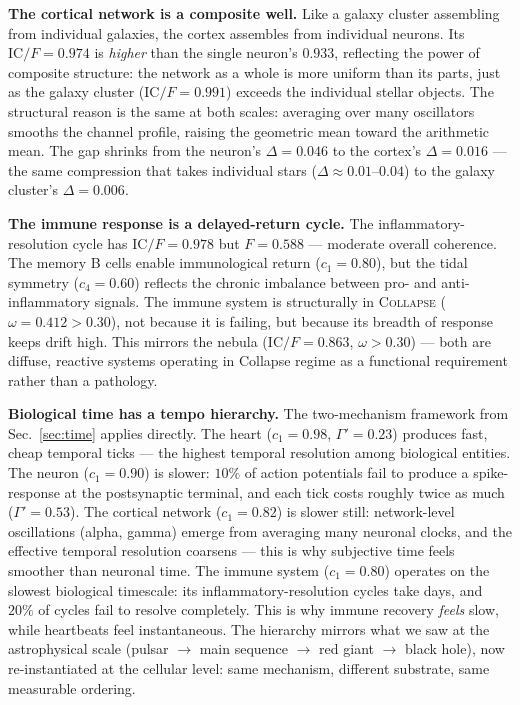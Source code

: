 \documentclass[
  aps,
  prd,
  twocolumn,
  superscriptaddress,
  nofootinbib,
  floatfix
]{revtex4-2}
\newcommand{\Gam}{\Gamma}
\newcommand{\regime}[1]{\textsc{#1}}
\newcommand{\IC}{\mathrm{IC}}
\begin{document}
\textbf{The cortical network is a composite well.}
Like a galaxy cluster assembling from individual galaxies,
the cortex assembles from individual neurons.  Its
$\IC/F = 0.974$ is \emph{higher} than the single neuron's
$0.933$, reflecting the power of composite structure: the
network as a whole is more uniform than its parts, just as
the galaxy cluster ($\IC/F = 0.991$) exceeds the individual
stellar objects.  The structural reason is the same at both
scales: averaging over many oscillators smooths the channel
profile, raising the geometric mean toward the arithmetic
mean.  The gap shrinks from the neuron's $\Delta = 0.046$ to
the cortex's $\Delta = 0.016$ --- the same compression that
takes individual stars ($\Delta \approx 0.01$--$0.04$) to
the galaxy cluster's $\Delta = 0.006$.

\textbf{The immune response is a delayed-return cycle.}
The inflammatory-resolution cycle has $\IC/F = 0.978$ but
$F = 0.588$ --- moderate overall coherence.  The memory B
cells enable immunological return ($c_1 = 0.80$), but the
tidal symmetry ($c_4 = 0.60$) reflects the chronic
imbalance between pro- and anti-inflammatory signals.
The immune system is structurally in \regime{Collapse}
($\omega = 0.412 > 0.30$), not because it is failing, but
because its breadth of response keeps drift high.  This
mirrors the nebula ($\IC/F = 0.863$, $\omega > 0.30$) ---
both are diffuse, reactive systems operating in Collapse
regime as a functional requirement rather than a pathology.

\textbf{Biological time has a tempo hierarchy.}
The two-mechanism framework from Sec.~\ref{sec:time} applies
directly.  The heart ($c_1 = 0.98$, $\Gam' = 0.23$)
produces fast, cheap temporal ticks --- the highest
temporal resolution among biological entities.  The neuron ($c_1 =
0.90$) is slower: $10\%$ of action potentials fail
to produce a spike-response at the postsynaptic terminal,
and each tick costs roughly twice as much ($\Gam' = 0.53$).
The cortical network ($c_1 = 0.82$) is slower still:
network-level oscillations (alpha, gamma) emerge from
averaging many neuronal clocks, and the effective temporal
resolution coarsens --- this is why subjective time feels
smoother than neuronal time.  The immune system ($c_1 =
0.80$) operates on the slowest biological timescale: its
inflammatory-resolution cycles take days, and $20\%$ of
cycles fail to resolve completely.  This is why immune
recovery \emph{feels} slow, while heartbeats feel
instantaneous.  The hierarchy mirrors what we saw at the
astrophysical scale (pulsar $\to$ main sequence $\to$ red
giant $\to$ black hole), now re-instantiated at the
cellular level: same mechanism, different substrate, same
measurable ordering.
\end{document}

